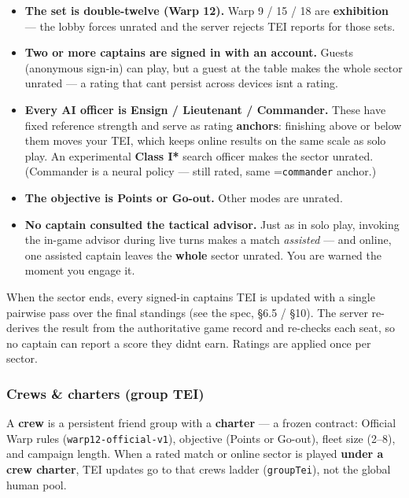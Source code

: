 \documentclass[11pt]{article}
\providecommand{\tightlist}{%
  \setlength{\itemsep}{0pt}\setlength{\parskip}{0pt}}
\begin{document}
\begin{itemize}
\tightlist
\item
  \textbf{The set is double-twelve (Warp 12).} Warp 9 / 15 / 18 are
  \textbf{exhibition} --- the lobby forces unrated and the server
  rejects TEI reports for those sets.
\item
  \textbf{Two or more captains are signed in with an account.} Guests
  (anonymous sign-in) can play, but a guest at the table makes the whole
  sector unrated --- a rating that can\textquotesingle t persist across
  devices isn\textquotesingle t a rating.
\item
  \textbf{Every AI officer is Ensign / Lieutenant / Commander.} These have fixed
  reference strength and serve as rating \textbf{anchors}: finishing
  above or below them moves your TEI, which keeps online results on the
  same scale as solo play. An experimental \textbf{Class I*} search
  officer makes the sector unrated. (Commander is a neural policy ---
  still rated, same \textsigma=\texttt{commander} anchor.)
\item
  \textbf{The objective is Points or Go-out.} Other modes are unrated.
\item
  \textbf{No captain consulted the tactical advisor.} Just as in solo
  play, invoking the in-game advisor during live turns makes a match
  \emph{assisted} --- and online, one assisted captain leaves the
  \textbf{whole} sector unrated. You are warned the moment you engage
  it.
\end{itemize}

When the sector ends, every signed-in captain\textquotesingle s TEI is
updated with a single pairwise pass over the final standings (see the
spec, §6.5 / §10). The server re-derives the result from the
authoritative game record and re-checks each seat, so no captain can
report a score they didn\textquotesingle t earn. Ratings are applied
once per sector.

\subsubsection{Crews \& charters (group
TEI)}\label{crews--charters-group-tei}

A \textbf{crew} is a persistent friend group with a \textbf{charter} ---
a frozen contract: Official Warp rules (\texttt{warp12-official-v1}),
objective (Points or Go-out), fleet size (2--8), and campaign length.
When a rated match or online sector is played \textbf{under a crew
charter}, TEI updates go to that crew\textquotesingle s ladder
(\texttt{groupTei}), not the global human pool.
\end{document}
